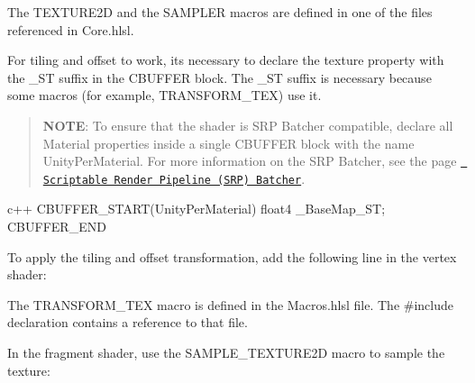 \begin{DoxyEnumerate}
\begin{DoxyCode}{0}
\DoxyCodeLine{++}

\end{DoxyCode}


The TEXTURE2D and the SAMPLER macros are defined in one of the files referenced in {\ttfamily Core.\+hlsl}.
\item For tiling and offset to work, it\textquotesingle{}s necessary to declare the texture property with the {\ttfamily \+\_\+\+ST} suffix in the \textquotesingle{}CBUFFER\textquotesingle{} block. The {\ttfamily \+\_\+\+ST} suffix is necessary because some macros (for example, {\ttfamily TRANSFORM\+\_\+\+TEX}) use it.
\end{DoxyEnumerate}

\begin{quote}
{\bfseries{NOTE}}\+: To ensure that the  shader is SRP Batcher compatible, declare all Material properties inside a single {\ttfamily CBUFFER} block with the name {\ttfamily Unity\+Per\+Material}. For more information on the SRP Batcher, see the page \href{https://docs.unity3d.com/Manual/SRPBatcher.html}{\texttt{ Scriptable Render Pipeline (SRP) Batcher}}. \end{quote}


{\ttfamily c++ CBUFFER\+\_\+\+START(\+Unity\+Per\+Material) float4 \+\_\+\+Base\+Map\+\_\+\+ST; CBUFFER\+\_\+\+END }


\begin{DoxyEnumerate}
\item To apply the tiling and offset transformation, add the following line in the vertex shader\+:


\begin{DoxyCode}{0}
\DoxyCodeLine{++}

\end{DoxyCode}


The {\ttfamily TRANSFORM\+\_\+\+TEX} macro is defined in the {\ttfamily Macros.\+hlsl} file. The {\ttfamily \#include} declaration contains a reference to that file.
\item In the fragment shader, use the {\ttfamily SAMPLE\+\_\+\+TEXTURE2D} macro to sample the texture\+:


\begin{DoxyCode}{0}
\DoxyCodeLine{++}
\DoxyCodeLine{\ \ \ \{}
\DoxyCodeLine{\ \ \ \}}

\end{DoxyCode}

\end{DoxyEnumerate}


